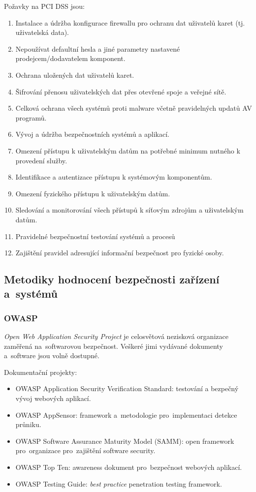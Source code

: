 Požavky na PCI DSS jsou:
\vspace*{-0.5em}\begin{enumerate}
\item Instalace a údržba konfigurace firewallu pro ochranu dat uživatelů karet (tj. uživatelská data).
\item Nepoužívat defaultní hesla a jiné parametry nastavené prodejcem/dodavatelem komponent.
\item Ochrana uložených dat uživatelů karet.
\item Šifrování přenosu uživatelských dat přes otevřené spoje a veřejné sítě.
\item Celková ochrana všech systémů proti malware včetně pravidelných updatů AV programů.
\item Vývoj a údržba bezpečnostních systémů a aplikací.
\item Omezení přístupu k uživatelským datům na potřebné minimum nutného k provedení služby.
\item Identifikace a autentizace přístupu k systémovým komponentům.
\item Omezení fyzického přístupu k uživatelským datům.
\item Sledování a monitorování všech přístupů k síťovým zdrojům a uživatelským datům.
\item Pravidelné bezpečnostní testování systémů a procesů
\item Zajištění pravidel adresující informační bezpečnost pro fyzické osoby.
\end{enumerate}


\subsection{Metodiky hodnocení bezpečnosti zařízení a~systémů}

\subsubsection{OWASP}

\emph{Open Web Application Security Project} je celosvětová nezisková organizace zaměřená na~softwarovou bezpečnost.
Veškeré jimi vydávané dokumenty a~software jsou volně dostupné.

Dokumentační projekty:
\vspace*{-0.5em}\begin{itemize}
    \item OWASP Application Security Verification Standard: testování a bezpečný vývoj webových aplikací.
    \item OWASP AppSensor: framework a~metodologie pro~implementaci detekce průniku.
    \item OWASP Software Assurance Maturity Model (SAMM): open framework pro~organizace pro~zajištění software security.
    \item OWASP Top Ten: awareness dokument pro~bezpečnost webových aplikací.
    \item OWASP Testing Guide: \emph{best practice} penetration testing framework.
\end{itemize}


